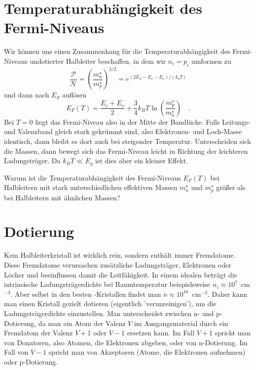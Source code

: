 \section{Temperaturabhängigkeit des Fermi-Niveaus}

Wir können uns einen Zusammenhang für die Temperaturabhängigkeit des Fermi-Niveaus   undotierter Halbleiter beschaffen, in dem wir $n_i = p_i$ umformen zu
\begin{equation}
    \frac{\mathcal{P}}{\mathcal{N}} = \left( \frac{m^\star_n}{m^\star_p} \right)^{3/2} = e^{(2 E_F - E_c - E_v)/(k_b T)}
\end{equation}
und dann nach $E_F$ auflösen
\begin{equation}
    E_F(T) = \frac{E_c + E_v}{2} + \frac{3}{4} k_B T \ln \left( \frac{m^\star_p}{m^\star_n} \right) \quad . \label{eq:5_Efermi_intr}
\end{equation}
Bei $T=0$ liegt das Fermi-Niveau also in der Mitte der Bandlücke. Falls Leitungs- und Valenzband gleich stark gekrümmt sind, also Elektronen- und Loch-Masse identisch, dann bleibt es dort auch bei steigender Temperatur. Unterscheiden sich die Massen, dann bewegt sich das Fermi-Niveau leicht in Richtung der leichteren Ladungsträger. Da $k_B T \ll E_g$ ist dies aber ein kleiner Effekt.

\begin{questions}
    \item Warum ist die Temperaturabhängigkeit des Fermi-Niveaus $E_F(T)$ bei Halbleitern mit stark unterschiedlichen effektiven Massen $m^\star_n$ und $m^\star_p$ größer als bei Halbleitern mit ähnlichen Massen?
\end{questions}


\section{Dotierung}

Kein Halbleiterkristall ist wirklich rein, sondern enthält immer Fremdatome. Diese Fremdatome verursachen zusätzliche Ladungsträger, Elektronen oder Löcher und beeinflussen damit die Leitfähigkeit. In einem idealen  beträgt die intrinsische Ladungsträgerdichte bei Raumtemperatur beispielsweise $n_i \approx 10^7$~cm$^{-3}$. Aber selbst in den besten -Kristallen findet man $n \approx 10^{16}$~cm$^{-3}$. Daher kann man einen Kristall gezielt dotieren (eigentlich 'verunreinigen'), um die Ladungsträgerdichte einzustellen. Man unterscheidet zwischen n- und p-Dotierung, da man ein Atom der Valenz $V$ im Ausgangsmaterial durch ein Fremdatom der Valenz $V+1$ oder $V-1$ ersetzen kann. Im Fall $V+1$ spricht man von Donatoren, also Atomen, die Elektronen abgeben, oder von n-Dotierung. Im Fall von $V-1$ spricht man von Akzeptoren (Atome, die Elektronen aufnehmen) oder p-Dotierung.

